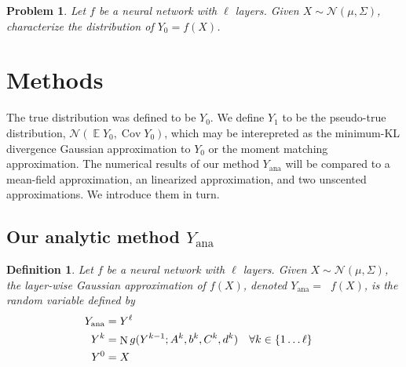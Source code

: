 \documentclass{article}
\newtheorem{definition}{Definition}
\newtheorem{problem}{Problem}
\DeclareMathOperator{\expect}{\mathbb{E}}
\DeclareMathOperator{\Cov}{\operatorname{Cov}}
\DeclareMathOperator{\normal}{\mathrm N}
\DeclareMathOperator{\Normal}{\mathrm N^*}
\begin{document}
\begin{problem}
    \label{prob:problem}
    Let \(f\) be a neural network with \(\ell\) layers.
    Given \(X \sim \mathcal N(\mu, \Sigma)\), characterize the distribution of \(Y_0 = f(X)\).
\end{problem}


\section{Methods}
The true distribution was defined to be \(Y_0\).
We define \(Y_1\) to be the pseudo-true distribution, \(\mathcal N(\expect Y_0, \Cov Y_0)\), which may be interepreted as the minimum-KL divergence Gaussian approximation to \(Y_0\) or the moment matching approximation.
The numerical results of our method \(Y_\text{ana}\) will be compared to a mean-field approximation, an linearized approximation, and two unscented approximations.
We introduce them in turn.

\subsection{Our analytic method \(Y_\mathrm{ana}\)}

\begin{definition}
    Let \(f\) be a neural network with \(\ell\) layers.
    Given \(X \sim \mathcal N(\mu, \Sigma)\), the layer-wise Gaussian approximation of \(f(X)\), denoted \(Y_\mathrm{ana} = \Normal f(X)\), is the random variable defined by
    \begin{align*}
        Y_\mathrm{ana} &=  Y^\ell\\
        Y^k &= \normal g(Y^{k-1}; A^k, b^k, C^k, d^k) & \forall k &\in \cbr{1 \ldots \ell} \\
        Y^0 &= X
    \end{align*}
\end{definition}
\end{document}
